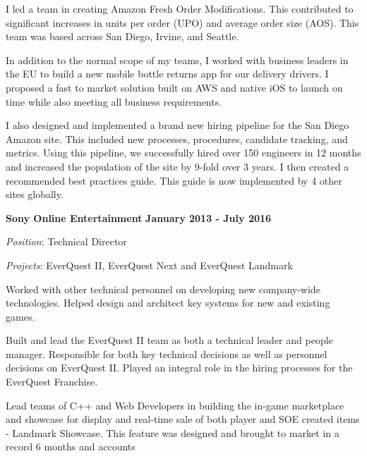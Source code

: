 \documentclass{article}
\begin{document}
\par
\vspace{\baselineskip}
I led a team in creating Amazon Fresh Order Modifications.  This contributed to significant increases in units per order (UPO) and average order size (AOS). This team was based across San Diego, Irvine, and Seattle.
\par
\vspace{\baselineskip}
In addition to the normal scope of my teams, I worked with business leaders in the EU to build a new mobile bottle returns app for our delivery drivers. I proposed a fast to market solution built on AWS and native iOS to launch on time while also meeting all business requirements.
\par
\vspace{\baselineskip}
I also designed and implemented a brand new hiring pipeline for the San Diego Amazon site. This included new processes, procedures, candidate tracking, and metrics.  Using this pipeline, we successfully hired over 150 engineers in 12 months and increased the population of the site by 9-fold over 3 years. I then created a recommended best practices guide. This guide is now implemented by 4 other sites globally. 
\par
\vspace{\baselineskip}
{\bf Sony Online Entertainment}
\hfill {\bf January 2013 - July 2016}
\vspace{.03in}
\par
{\it Position}: Technical Director
\par
{\it Projects}: EverQuest II, EverQuest Next and EverQuest Landmark
\vspace{\baselineskip}
\par
Worked with other technical personnel on developing new company-wide
technologies.  Helped design and architect key systems for new and existing
games.
\par
\vspace{\baselineskip}
Built and lead the EverQuest II team as both a technical leader and people manager.  Responsible for both key technical decisions as well as personnel decisions on EverQuest II.  Played an integral role in the hiring processes for the EverQuest Franchise.
\par
\vspace{\baselineskip}
Lead teams of C++ and Web Developers in building the
in-game marketplace and showcase for display and real-time sale of both player and SOE created items - 
Landmark Showcase.  This feature was designed and brought to market in a record 6 months and accounts
\end{document}
